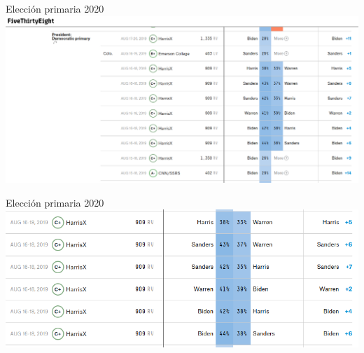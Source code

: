 \documentclass[bigger]{beamer}
\begin{document}
\begin{frame}[label={sec:org2e8aa43}]{Elección primaria 2020}
\centering
\includegraphics[width=\textwidth]{./pics/cycle-2019-dem-primary.png}
\end{frame}
\begin{frame}[label={sec:org66e41e1}]{Elección primaria 2020}
\flushright
\includegraphics[width=.95\textwidth]{./pics/cycle-2019-dem-primary-zoom.png}
\end{frame}
\end{document}
